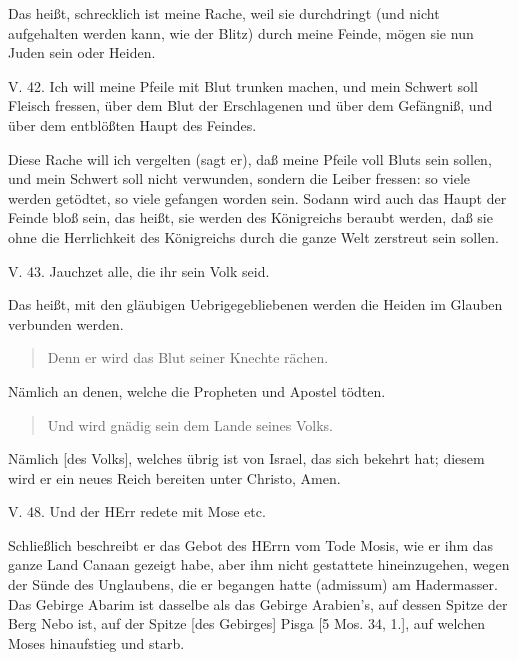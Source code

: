 Das heißt, schrecklich ist meine Rache, weil sie durchdringt (und nicht aufgehalten werden kann, wie der Blitz) durch meine Feinde, mögen sie nun Juden sein oder Heiden.

\begin{schriftzitat}
V. 42. Ich will meine Pfeile mit Blut trunken machen, und mein Schwert soll Fleisch fressen, über dem Blut der Erschlagenen und über dem Gefängniß, und über dem entblößten Haupt des Feindes.
\end{schriftzitat}

Diese Rache will ich vergelten (sagt er), daß meine Pfeile voll Bluts sein sollen, und mein Schwert soll nicht verwunden, sondern die Leiber fressen: so viele werden getödtet, so viele gefangen worden sein. Sodann wird auch das Haupt der Feinde bloß sein, das heißt, sie werden des Königreichs beraubt werden, daß sie ohne die Herrlichkeit des Königreichs durch die ganze Welt zerstreut sein sollen.

\begin{schriftzitat}
V. 43. Jauchzet alle, die ihr sein Volk seid.
\end{schriftzitat}

Das heißt, mit den gläubigen Uebrigegebliebenen werden die Heiden im Glauben verbunden werden.

\begin{quote}
Denn er wird das Blut seiner Knechte rächen.
\end{quote}

Nämlich an denen, welche die Propheten und Apostel tödten.

\begin{quote}
Und wird gnädig sein dem Lande seines Volks.
\end{quote}

Nämlich [des Volks], welches übrig ist von Israel, das sich bekehrt hat; diesem wird er ein neues Reich bereiten unter Christo, Amen.

\begin{schriftzitat}
V. 48. Und der HErr redete mit Mose etc.
\end{schriftzitat}

Schließlich beschreibt er das Gebot des HErrn vom Tode Mosis, wie er ihm das ganze Land Canaan gezeigt habe, aber ihm nicht gestattete hineinzugehen, wegen der Sünde des Unglaubens, die er begangen hatte (admissum) am Hadermasser. Das Gebirge Abarim ist dasselbe als das Gebirge Arabien's, auf dessen Spitze der Berg Nebo ist, auf der Spitze [des Gebirges] Pisga [5 Mos. 34, 1.], auf welchen Moses hinaufstieg und starb.

